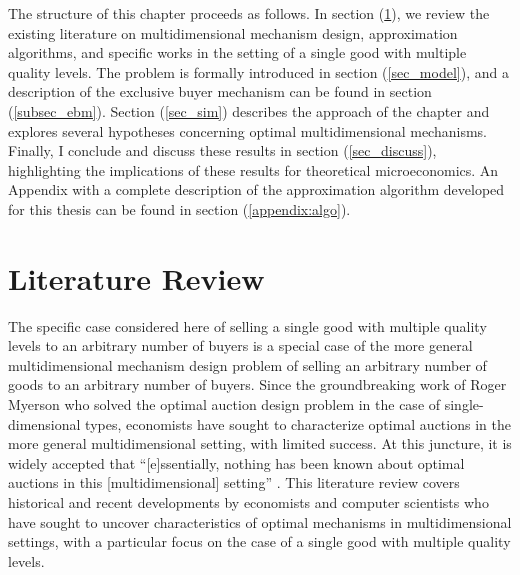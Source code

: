 The structure of this chapter proceeds as follows. In section (\ref{sec_litreview}), we review the existing literature on multidimensional mechanism design, approximation algorithms, and specific works in the setting of a single good with multiple quality levels. The problem is formally introduced in section (\ref{sec_model}), and a description of the exclusive buyer mechanism can be found in section (\ref{subsec_ebm}). Section (\ref{sec_sim}) describes the approach of the chapter and explores several hypotheses concerning optimal multidimensional mechanisms. Finally, I conclude and discuss these results in section (\ref{sec_discuss}), highlighting the implications of these results for theoretical microeconomics. An Appendix with a complete description of the approximation algorithm developed for this thesis can be found in section (\ref{appendix:algo}).








\section{Literature Review}\label{sec_litreview}


The specific case considered here of selling a single good with multiple quality levels to an arbitrary number of buyers is a special case of the more general multidimensional mechanism design problem of selling an arbitrary number of goods to an arbitrary number of buyers. Since the groundbreaking work of Roger Myerson \autocite*{myerson1981optimal} who solved the optimal auction design problem in the case of single-dimensional types, economists have sought to characterize optimal auctions in the more general multidimensional setting, with limited success. At this juncture, it is widely accepted that ``[e]ssentially, nothing has been known about optimal auctions in this [multidimensional] setting'' \autocite[p1]{kolesnikov2022}. This literature review covers historical and recent developments by economists and computer scientists who have sought to uncover characteristics of optimal mechanisms in multidimensional settings, with a particular focus on the case of a single good with multiple quality levels.

